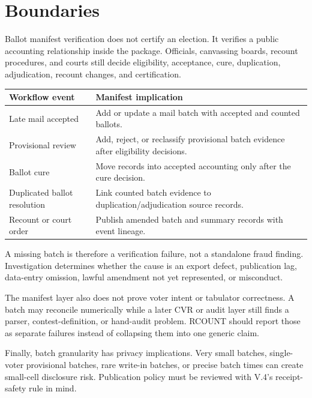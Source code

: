 \section{Boundaries}

Ballot manifest verification does not certify an election. It verifies a public
accounting relationship inside the package. Officials, canvassing boards,
recount procedures, and courts still decide eligibility, acceptance, cure,
duplication, adjudication, recount changes, and certification.

\begin{center}
\small
\begin{tabularx}{\textwidth}{lX}
\toprule
Workflow event & Manifest implication \\
\midrule
Late mail accepted & Add or update a mail batch with accepted and counted ballots. \\
Provisional review & Add, reject, or reclassify provisional batch evidence after eligibility decisions. \\
Ballot cure & Move records into accepted accounting only after the cure decision. \\
Duplicated ballot resolution & Link counted batch evidence to duplication/adjudication source records. \\
Recount or court order & Publish amended batch and summary records with event lineage. \\
\bottomrule
\end{tabularx}
\end{center}

A missing batch is therefore a verification failure, not a standalone fraud
finding. Investigation determines whether the cause is an export defect,
publication lag, data-entry omission, lawful amendment not yet represented, or
misconduct.

The manifest layer also does not prove voter intent or tabulator correctness. A
batch may reconcile numerically while a later CVR or audit layer still finds a
parser, contest-definition, or hand-audit problem. RCOUNT should report those
as separate failures instead of collapsing them into one generic claim.

Finally, batch granularity has privacy implications. Very small batches,
single-voter provisional batches, rare write-in batches, or precise batch times
can create small-cell disclosure risk. Publication policy must be reviewed with
V.4's receipt-safety rule in mind.

